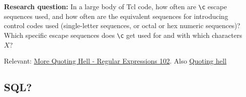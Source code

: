 \textbf{Research question:}
In a large body of Tcl code, how often are \verb|\c| escape sequences used,
and how often are the equivalent sequences for introducing control codes used
(\eg single-letter sequences, or octal or hex numeric sequences)?
Which specific escape sequences does \verb|\c| get used for
and with which characters $X$?

Relevant: \href{https://www.tcl.tk/man/tcl8.5/tutorial/Tcl21.html}{More Quoting Hell - Regular Expressions 102}.
Also \href{https://wiki.tcl-lang.org/page/Quoting+hell}{Quoting hell}

\subsection{SQL?}

